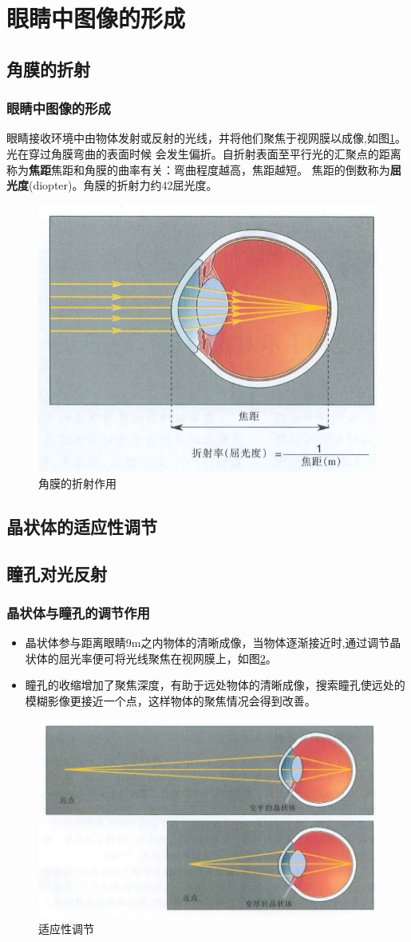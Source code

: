 \section{眼睛中图像的形成}
\subsection{角膜的折射}
\begin{frame}
    \frametitle{眼睛中图像的形成}

    眼睛接收环境中由物体发射或反射的光线，并将他们聚焦于视网膜以成像,如图\ref{pic3-1}。光在穿过角膜弯曲的表面时候
    会发生偏折。自折射表面至平行光的汇聚点的距离称为\textbf{焦距}焦距和角膜的曲率有关：弯曲程度越高，焦距越短。
    焦距的倒数称为\textbf{屈光度}(diopter)。角膜的折射力约42屈光度。
    \begin{figure}
        \centering
        \includegraphics[height=0.3\textwidth]{img/pic3-1.png}
        \caption{角膜的折射作用\label{pic3-1}}
    \end{figure}

\end{frame}

\subsection{晶状体的适应性调节}
\subsection{瞳孔对光反射}

\begin{frame}
    \frametitle{晶状体与瞳孔的调节作用}
    \begin{itemize}
        \item 晶状体参与距离眼睛9m之内物体的清晰成像，当物体逐渐接近时,通过调节晶状体的屈光率便可将光线聚焦在视网膜上，如图\ref{pic3-2}。
        \item 瞳孔的收缩增加了聚焦深度，有助于远处物体的清晰成像，搜索瞳孔使远处的模糊影像更接近一个点，这样物体的聚焦情况会得到改善。
    \end{itemize}
    \begin{figure}
        \centering
        \includegraphics[height=0.3\textwidth]{img/pic3-2.png}
        \caption{适应性调节\label{pic3-2}}
    \end{figure}
\end{frame}

